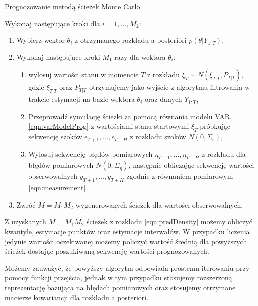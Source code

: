 \begin{algDefinition}{Prognozowanie metodą ścieżek Monte Carlo}

Wykonaj następujące kroki dla $i = 1, \dots, M_2$:

\begin{enumerate}
    \item Wybierz wektor $\theta_i$ z otrzymanego rozkładu a posteriori $p(\theta|Y_{1:T})$.
    \item Wykonaj następujące kroki $M_1$ razy dla wektora $\theta_i$:
    \begin{enumerate}
        \item wylosuj wartości stanu w momencie $T$ z rozkładu $\xi_T \sim N(\xi_{T|T}, P_{T|T})$, gdzie $\xi_{T|T}$ oraz $P_{T|T}$ otrzymujemy jako wyjście z algorytmu filtrowania w trakcie estymacji na bazie wektora $\theta_i$ oraz danych $Y_{1:T}$,
        \item Przeprowadź symulację ścieżki za pomocą równania modelu VAR \ref{eqn:varModelProg} z wartościami stanu startowymi $\xi_T$ próbkując sekwencję szoków $\epsilon_{T+1}, \dots, \epsilon_{T+H}$ z rozkładu szoków $N(0, \Sigma_\epsilon)$,
        \item Wylosuj sekwencję błędów pomiarowych $\eta_{T+1}, \dots, \eta_{T+H}$ z rozkładu dla błędów pomiarowych $N(0, \Sigma_\eta)$, następnie obliczając sekwencję wartości obserwowalnych $y_{T+1}, \dots, y_{T+H}$ zgodnie z równaniem pomiarowym \eqref{eqn:measurement}.
    \end{enumerate}
    \item Zwróć $M = M_1 M_2$ wygenerowanych ścieżek dla wartości obserwowalnych.
\end{enumerate}
    
\end{algDefinition}

Z uzyskanych $M = M_1 M_2$ ścieżek z rozkładu \eqref{eqn:predDensity} możemy obliczyć kwantyle, estymacje punktów oraz estymacje interwałów. W przypadku liczenia jedynie wartości oczekiwanej możemy policzyć wartość średnią dla powyższych ścieżek dostając poszukiwaną sekwencję wartości prognozowanych. 

Możemy zauważyć, że powyższy algorytm odpowiada prostemu iterowaniu przy pomocy funkcji przejścia, jednak w tym przypadku stosujemy rozszerzoną reprezentację bazująca na błędach pomiarowych oraz stosujemy otrzymane macierze kowariancji dla rozkładu a posteriori.




